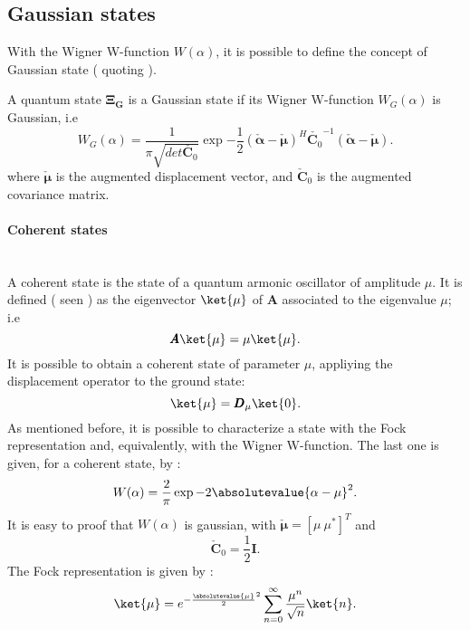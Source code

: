     \subsection{Gaussian states}
    With the Wigner W-function $W(\alpha)$, it is possible to define the concept of Gaussian state
    (\cite{tesiGuerrini} quoting \cite{Gaussian1,Gaussian2,Gaussian3,Gaussian4,Gaussian5}).
    \begin{definition}
        A quantum state $\pmb{\Xi_G}$ is a Gaussian state if its Wigner W-function $W_G(\alpha)$
        is Gaussian, i.e
        \begin{equation}
            W_G(\alpha)=\frac{1}{\pi\sqrt{det\check{\pmb{C}_0}}}\exp{
                -\frac{1}{2}(\check{\pmb{\alpha}}-\check{\pmb{\mu}})^H
                \check{\pmb{C}_0}^{-1}(\check{\pmb{\alpha}}-\check{\pmb{\mu}})}.
        \end{equation}
        where $\check{\pmb{\mu}} $ is the augmented displacement vector, and $\check{\pmb{C}}_0$ 
        is the augmented covariance matrix.
        \label{def:Gaussian}
    \end{definition}

    \paragraph{Coherent states}\mbox{} \\
        A coherent state is the state of a quantum armonic oscillator of amplitude $\mu$.
        It is defined (\cite{tesiGuerrini} seen \cite{CohSt_Glauber,CohSt_Glauber2}) as the eigenvector $\ket{\mu}$ of $\pmb{A}$ 
        associated to the eigenvalue $\mu$; i.e
        \begin{equation}
            \pmb{A}\ket{\mu}=\mu\ket{\mu}.
        \end{equation}
        It is possible to obtain a coherent state of parameter $\mu$, appliying the displacement
        operator to the ground state:
        \begin{equation}
            \ket{\mu}=\pmb{D}_\mu\ket{0}.
        \end{equation}
        As mentioned before, it is possible to characterize a state with the Fock representation
        and, equivalently, with the Wigner W-function. The last one is given, for a coherent state,
        by \cite{QuantumNoise}:
        \begin{equation}
            W(\alpha)=\frac{2}{\pi}\exp{-2\absolutevalue{\alpha-\mu}^2}.
        \end{equation}
        It is easy to proof that $W(\alpha)$ is gaussian, with $\check{\pmb{\mu}}=[\mu\ \mu^*]^T$ and
        \begin{equation*}
            \check{\pmb{C}}_0=\frac{1}{2}\pmb{I}.
        \end{equation*} 
        The Fock representation is given by \cite{Dowling}:
        \begin{equation}
            \ket{\mu}=e^{-\frac{\absolutevalue{\mu}}{2}^2}\sum_{n=0}^{\infty}
            \frac{\mu^n}{\sqrt{n}}\ket{n}.
        \end{equation}

